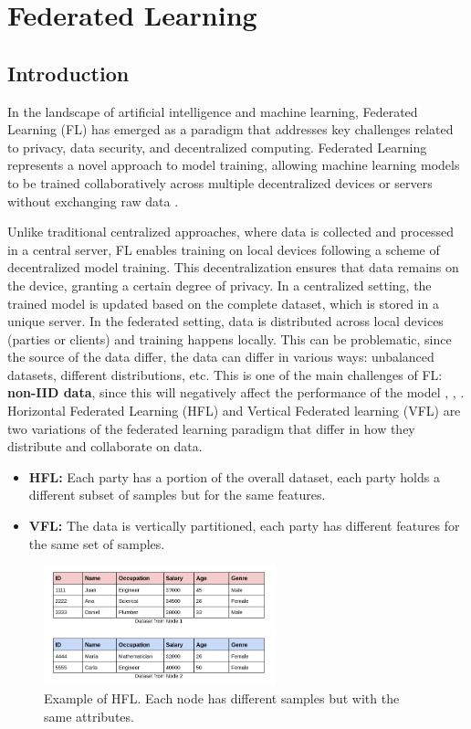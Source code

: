 \chapter{Federated Learning}
\label{ch:Federated_Learning}

\section{Introduction}
In the landscape of artificial intelligence and machine learning, Federated Learning (FL)
has emerged as a paradigm that addresses key challenges related to privacy, data security,
 and decentralized computing. Federated Learning represents a novel approach to model training, allowing
 machine learning models to be trained collaboratively across multiple decentralized devices or servers
 without exchanging raw data \cite{mcmahan2023a}.

 Unlike traditional centralized approaches, where data is collected and processed in a central server, FL enables training on local devices following a scheme of decentralized model training.
 This decentralization ensures that data remains on the device, granting a certain degree of privacy.
 In a centralized setting, the trained model is updated based on the complete dataset, which is stored in a unique server. In the federated setting, data is distributed across local devices (parties or clients) and training happens locally. This can be problematic, since the source
 of the data differ, the data can differ in various ways: unbalanced datasets, different distributions, etc. This is one of the main challenges of FL:
 \textbf{non-IID data}, since this will negatively affect the performance of the model \cite{li2020}, \cite{zhao2018}, \cite{li2021}.\\
Horizontal Federated Learning (HFL) and Vertical Federated learning (VFL) are two variations of the federated learning paradigm that differ in how they distribute and collaborate on data.

\begin{itemize}
    \item \textbf{HFL:} Each party has a portion of the overall dataset, each party holds a different subset of samples but for the same features.
    \item \textbf{VFL:} The data  is vertically partitioned, each party has different features for the same set of samples.
\end{itemize}

\begin{figure}[H]
  \centering
  \includegraphics[width=0.6\textwidth]{figures/2-Federated_Learning/HFL.png}
  \caption{Example of HFL. Each node has different samples but with the same attributes.}
  \label{fig:HFL}
\end{figure}


